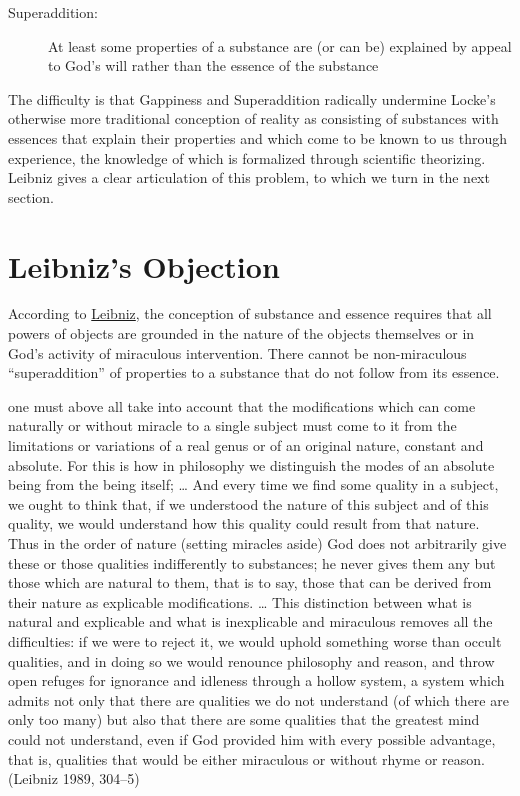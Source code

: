 \documentclass[12pt]{article}
\makeatletter
\newcommand{\citeprocitem}[2]{\hyper@linkstart{cite}{citeproc_bib_item_#1}#2\hyper@linkend}
\makeatother
\begin{document}
\begin{description}
\item[{Superaddition:}] At least some properties of a substance are (or can be) explained
by appeal to God's will rather than the essence of the substance
\end{description}


The difficulty is that Gappiness and Superaddition radically undermine Locke's
otherwise more traditional conception of reality as consisting of substances with
essences that explain their properties and which come to be known to us through
experience, the knowledge of which is formalized through scientific theorizing.
Leibniz gives a clear articulation of this problem, to which we turn in the next
section.

\section{Leibniz's Objection}
\label{sec:orgf0ab4d3}

According to \href{https://plato.stanford.edu/entries/leibniz/}{Leibniz}, the conception of substance and essence requires that all
powers of objects are grounded in the nature of the objects themselves or in God's
activity of miraculous intervention. There cannot be non-miraculous ``superaddition''
of properties to a substance that do not follow from its essence.

\begin{quote-b}
one must above all take into account that the modifications which
can come naturally or without miracle to a single subject must come
to it from the limitations or variations of a real genus or of an
original nature, constant and absolute. For this is how in
philosophy we distinguish the modes of an absolute being from the
being itself; \ldots{} And every time we find some quality in a subject,
we ought to think that, if we understood the nature of this subject
and of this quality, we would understand how this quality could
result from that nature. Thus in the order of nature (setting
miracles aside) God does not arbitrarily give these or those
qualities indifferently to substances; he never gives them any but
those which are natural to them, that is to say, those that can be
derived from their nature as explicable modifications. \ldots{} This
distinction between what is natural and explicable and what is
inexplicable and miraculous removes all the difficulties: if we were
to reject it, we would uphold something worse than occult qualities,
and in doing so we would renounce philosophy and reason, and throw
open refuges for ignorance and idleness through a hollow system, a
system which admits not only that there are qualities we do not
understand (of which there are only too many) but also that there
are some qualities that the greatest mind could not understand, even
if God provided him with every possible advantage, that is,
qualities that would be either miraculous or without rhyme or
reason.(\citeprocitem{5}{Leibniz 1989, 304–5})
\end{quote-b}
\end{document}
